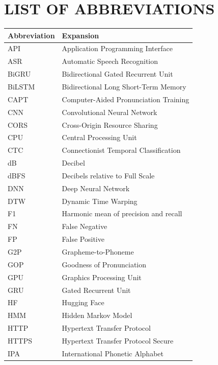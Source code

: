 \chapter*{LIST OF ABBREVIATIONS}

\begin{center}
\begin{tabular}{@{}p{3.2cm}p{10.0cm}@{}}
\toprule
\textbf{Abbreviation} & \textbf{Expansion} \\
\midrule
API      & Application Programming Interface \\
ASR      & Automatic Speech Recognition \\
BiGRU    & Bidirectional Gated Recurrent Unit \\
BiLSTM   & Bidirectional Long Short-Term Memory \\
CAPT     & Computer-Aided Pronunciation Training \\
CNN      & Convolutional Neural Network \\
CORS     & Cross-Origin Resource Sharing \\
CPU      & Central Processing Unit \\
CTC      & Connectionist Temporal Classification \\
dB       & Decibel \\
dBFS     & Decibels relative to Full Scale \\
DNN      & Deep Neural Network \\
DTW      & Dynamic Time Warping \\
F1       & Harmonic mean of precision and recall \\
FN       & False Negative \\
FP       & False Positive \\
G2P      & Grapheme-to-Phoneme \\
GOP      & Goodness of Pronunciation \\
GPU      & Graphics Processing Unit \\
GRU      & Gated Recurrent Unit \\
HF       & Hugging Face \\
HMM      & Hidden Markov Model \\
HTTP     & Hypertext Transfer Protocol \\
HTTPS    & Hypertext Transfer Protocol Secure \\
IPA      & International Phonetic Alphabet \\
\bottomrule
\end{tabular}
\end{center}

